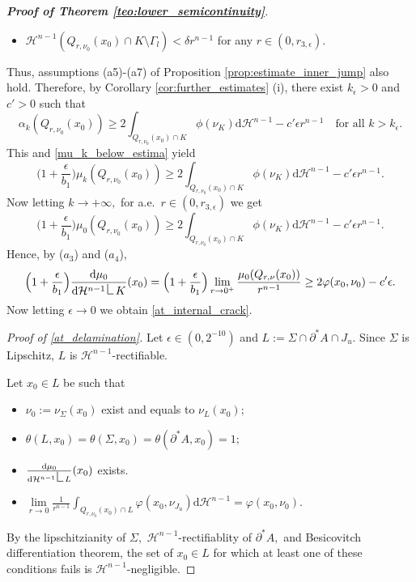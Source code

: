 \documentclass[reqno]{amsart}
\numberwithin{equation}{section}
\theoremstyle{plain}
\theoremstyle{definition}
\newcommand{\cH}{\mathcal{H}}
\newcommand{\p}{\partial}
\newcommand{\bound}{b}
\renewcommand{\d}{\mathrm{d}}
\newcommand{\res}{\mathop{\hbox{\vrule height 9pt width 0.5pt depth 0pt
\vrule height 0.5pt width 5pt depth 0pt}}\nolimits}
\begin{document}
\begin{proof}[\textbf{Proof of Theorem \ref{teo:lower_semicontinuity}}]
\begin{itemize}
\item  $\cH^{n-1}(Q_{r,\nu_0}(x_0)\cap K\setminus\Gamma_l)<\delta r^{n-1}$ for any $r\in(0,r_{3,\epsilon}).$ 
 \end{itemize}
%
Thus, assumptions (a5)-(a7) of Proposition \ref{prop:estimate_inner_jump} also hold. Therefore, by Corollary \ref{cor:further_estimates} (i), there exist  $k_\epsilon>0$ and $c'>0$ such that
$$
\alpha_k(Q_{r,\nu_0}(x_0)) \ge 2\int_{Q_{r,\nu_0}(x_0)\cap K} \phi(\nu_K)\d\cH^{n-1} -c'\epsilon r^{n-1} \quad \text{for all $k>k_\epsilon.$}
$$
This and \eqref{mu_k_below_estima} yield
$$
\Big(1 + \frac{\epsilon}{\bound_1}\Big) \mu_k(Q_{r,\nu_0}(x_0)) \ge 2\int_{Q_{r,\nu_0}(x_0)\cap K}\phi(\nu_K)\d\cH^{n-1} -c'\epsilon r^{n-1}.
$$
Now letting $k\to+\infty,$ for a.e.\  $r\in(0,r_{3,\epsilon})$ we get
$$
\Big(1 + \frac{\epsilon}{\bound_1}\Big) \mu_0(Q_{r,\nu_0}(x_0)) \ge 2\int_{Q_{r,\nu_0}(x_0)\cap K}\phi(\nu_K)\d\cH^{n-1} -c'\epsilon r^{n-1}.
$$
Hence, by ($a_3$) and ($a_4$),
$$
\Big(1 + \frac{\epsilon}{\bound_1}\Big) \frac{\d\mu_0}{\d\cH^{n-1}\res K} (x_0) = \Big(1 + \frac{\epsilon}{\bound_1}\Big) \lim\limits_{r\to0^+}\frac{\mu_0(Q_{r,\nu}(x_0))}{r^{n-1}} 
\ge 2\varphi(x_0,\nu_0) - c'\epsilon.
$$
Now letting $\epsilon\to0$ we obtain  \eqref{at_internal_crack}.
\smallskip 

{\it Proof of \eqref{at_delamination}.} Let $\epsilon\in(0,2^{-10})$ and  $L:=\Sigma\cap \p^*A\cap J_u.$ Since $\Sigma$ is Lipschitz, $L$ is $\cH^{n-1}$-rectifiable.

Let $x_0\in L$ be such that 
\begin{itemize}
 \item[($\rm b_1$)] $\nu_0:=\nu_\Sigma(x_0)$ exist and equals to $\nu_L(x_0);$ 
 
 \item[($\rm b_2$)] $\theta(L,x_0)=\theta(\Sigma,x_0)=\theta(\p^*A,x_0) = 1;$ 
 
 \item[($\rm b_3$)] $\frac{\d\mu_0}{\d\cH^{n-1}\res L}(x_0)$ exists.
 
 \item[($\rm b_4$)]  $\lim\limits_{r\to0} \frac{1}{r^{n-1}} \int_{Q_{r,\nu_0}(x_0)\cap L}\varphi(x_0,\nu_{J_u})\d\cH^{n-1} =\varphi(x_0,\nu_0).$
 
\end{itemize}
%
By the lipschitzianity of $\Sigma,$ $\cH^{n-1}$-rectifiablity of $\p^*A,$ \cite[Theorem 2.63]{AFP:2000} and Besicovitch differentiation theorem, the set of $x_0\in L$ for which at least one of these conditions fails is $\cH^{n-1}$-negligible.   


\end{proof}
\end{document}
